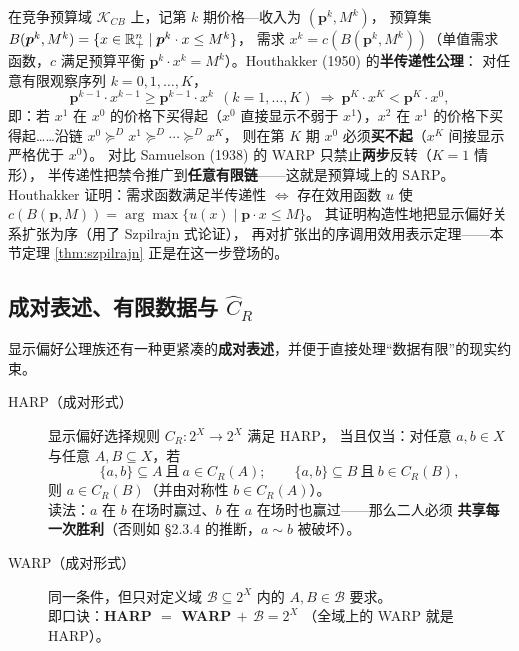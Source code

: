 \begin{remark}\label{rem:houthakker}
在竞争预算域 $\mathcal{K}_{CB}$ 上，记第 $k$ 期价格—收入为 $(\boldsymbol{p}^k,M^k)$，
预算集 $B(\boldsymbol{p}^k,M^k)=\{x\in\mathbb{R}^n_+\mid \boldsymbol{p}^k\cdot x\le M^k\}$，
需求 $x^k=c(B(\boldsymbol{p}^k,M^k))$（单值需求函数，$c$ 满足预算平衡
$\boldsymbol{p}^k\cdot x^k=M^k$）。Houthakker (1950) 的\textbf{半传递性公理}：
对任意有限观察序列 $k=0,1,\dots,K$，
\[
\boldsymbol{p}^{k-1}\cdot x^{k-1}\ge \boldsymbol{p}^{k-1}\cdot x^k
\ \ (k=1,\dots,K)\ \Longrightarrow\
\boldsymbol{p}^{K}\cdot x^{K}<\boldsymbol{p}^{K}\cdot x^{0},
\]
即：若 $x^1$ 在 $x^0$ 的价格下买得起（$x^0$ 直接显示不弱于 $x^1$），$x^2$ 在
$x^1$ 的价格下买得起……沿链 $x^0\succeq^D x^1\succeq^D\cdots\succeq^D x^K$，
则在第 $K$ 期 $x^0$ 必须\textbf{买不起}（$x^K$ 间接显示严格优于 $x^0$）。
对比 Samuelson (1938) 的 WARP 只禁止\textbf{两步}反转（$K=1$ 情形），
半传递性把禁令推广到\textbf{任意有限链}——这就是预算域上的 SARP。
Houthakker 证明：需求函数满足半传递性 $\iff$ 存在效用函数 $u$ 使
$c(B(\boldsymbol{p},M))=\arg\max\{u(x)\mid \boldsymbol{p}\cdot x\le M\}$。
其证明构造性地把显示偏好关系扩张为序（用了 Szpilrajn 式论证），
再对扩张出的序调用效用表示定理——本节定理 \ref{thm:szpilrajn} 正是在这一步登场的。
\end{remark}

\subsection{成对表述、有限数据与 \texorpdfstring{$\widehat{C}_R$}{Ĉ\_R}}

显示偏好公理族还有一种更紧凑的\textbf{成对表述}，并便于直接处理“数据有限”的现实约束。

\begin{definition}\label{def:slideswarp}
\begin{description}
  \item[HARP（成对形式）] 显示偏好选择规则 $C_R: 2^X\to 2^X$ 满足 HARP，
  当且仅当：对任意 $a,b\in X$ 与任意 $A,B\subseteq X$，若
  \[
  \{a,b\}\subseteq A\ \text{且}\ a\in C_R(A);\qquad
  \{a,b\}\subseteq B\ \text{且}\ b\in C_R(B),
  \]
  则 $a\in C_R(B)$（并由对称性 $b\in C_R(A)$）。\\
  读法：$a$ 在 $b$ 在场时赢过、$b$ 在 $a$ 在场时也赢过——那么二人必须
  \textbf{共享每一次胜利}（否则如 §2.3.4 的推断，$a\sim b$ 被破坏）。
  \item[WARP（成对形式）] 同一条件，但只对定义域 $\mathcal{B}\subseteq 2^X$
  内的 $A,B\in\mathcal{B}$ 要求。\\
  即口诀：\textbf{HARP $=$ WARP $+$ $\mathcal{B}=2^X$}
  （全域上的 WARP 就是 HARP）。
\end{description}
\end{definition}


